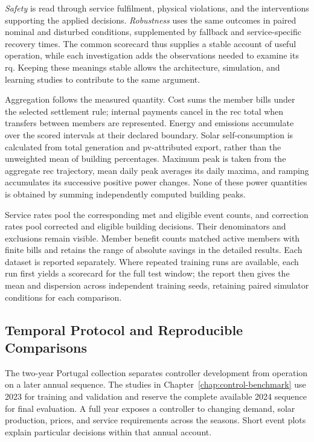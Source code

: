 \emph{Safety} is read through service fulfilment, physical violations, and the interventions supporting the applied decisions. \emph{Robustness} uses the same outcomes in paired nominal and disturbed conditions, supplemented by fallback and service-specific recovery times. The common scorecard thus supplies a stable account of useful operation, while each investigation adds the observations needed to examine its \gls{rq}. Keeping these meanings stable allows the architecture, simulation, and learning studies to contribute to the same argument.

Aggregation follows the measured quantity. Cost sums the member bills under the selected settlement rule; internal payments cancel in the \gls{rec} total when transfers between members are represented. Energy and emissions accumulate over the scored intervals at their declared boundary. Solar self-consumption is calculated from total generation and \gls{pv}-attributed export, rather than the unweighted mean of building percentages. Maximum peak is taken from the aggregate \gls{rec} trajectory, mean daily peak averages its daily maxima, and ramping accumulates its successive positive power changes. None of these power quantities is obtained by summing independently computed building peaks.

Service rates pool the corresponding met and eligible event counts, and correction rates pool corrected and eligible building decisions. Their denominators and exclusions remain visible. Member benefit counts matched active members with finite bills and retains the range of absolute savings in the detailed results. Each dataset is reported separately. Where repeated training runs are available, each run first yields a scorecard for the full test window; the report then gives the mean and dispersion across independent training seeds, retaining paired simulator conditions for each comparison.

\subsection{Temporal Protocol and Reproducible Comparisons}
\label{sec:sim-temporal-protocol}

The two-year Portugal collection separates controller development from operation on a later annual sequence. The studies in Chapter~\ref{chap:control-benchmark} use 2023 for training and validation and reserve the complete available 2024 sequence for final evaluation. A full year exposes a controller to changing demand, solar production, prices, and service requirements across the seasons. Short event plots explain particular decisions within that annual account.

